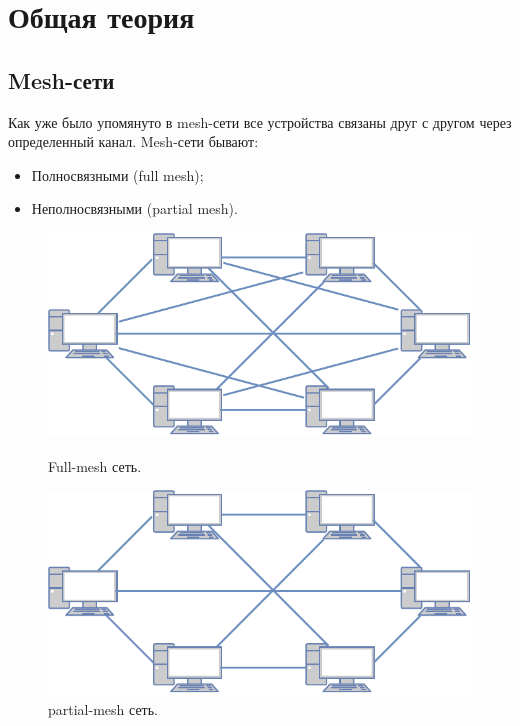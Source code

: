 \documentclass[a4paper]{article}
\begin{document}
\section{Общая теория}

\subsection{Mesh-сети}
Как уже было упомянуто в mesh-сети все устройства связаны друг с другом через определенный канал.
Mesh-сети бывают: 
\begin{itemize}
    \item Полносвязными (full mesh);
    \item Неполносвязными (partial mesh).
\end{itemize}

\begin{figure}[H]
	\begin{center}
	\begin{minipage}[h]{0.45\linewidth}
	\includegraphics[width=1\linewidth]{full.pdf}
	\caption{Full-mesh сеть.} 
    \label{p2}
	\end{minipage}
	\hfill 
	\begin{minipage}[h]{0.43\linewidth}
	\includegraphics[width=1\linewidth]{partial.pdf}
	\caption{partial-mesh сеть.}
	\label{p3}
	\end{minipage}
	\end{center}
\end{figure}
\end{document}
